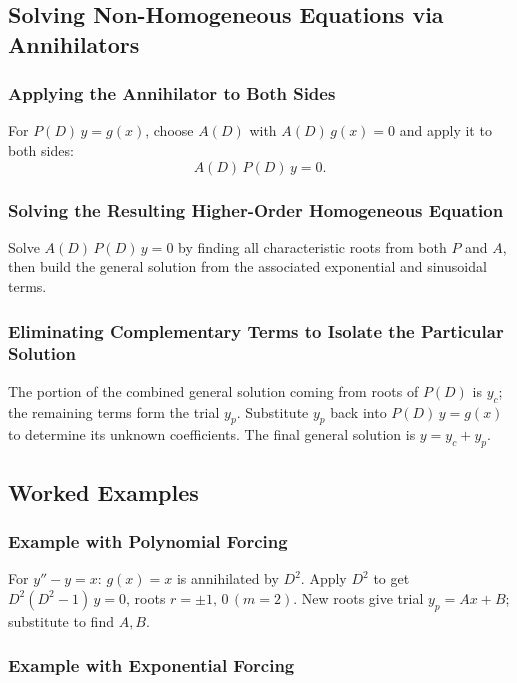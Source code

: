 \documentclass[10pt]{article}
\newcommand{\m}[1]{$#1$}
\newcommand{\annotspace}[1][3.5cm]{\vspace{#1}}
\begin{document}
\subsection{Solving Non-Homogeneous Equations via Annihilators}

    \subsubsection{Applying the Annihilator to Both Sides}
    For \m{P(D)\,y = g(x)}, choose \m{A(D)} with \m{A(D)\,g(x) = 0} and apply it to both sides:
    \[
        A(D)\,P(D)\,y = 0.
    \]

    \subsubsection{Solving the Resulting Higher-Order Homogeneous Equation}
    Solve \m{A(D)\,P(D)\,y = 0} by finding all characteristic roots from both \m{P} and \m{A}, then
    build the general solution from the associated exponential and sinusoidal terms.

    \subsubsection{Eliminating Complementary Terms to Isolate the Particular Solution}
    The portion of the combined general solution coming from roots of \m{P(D)} is \m{y_c}; the
    remaining terms form the trial \m{y_p}. Substitute \m{y_p} back into \m{P(D)\,y = g(x)} to
    determine its unknown coefficients. The final general solution is \m{y = y_c + y_p}.

\subsection{Worked Examples}

    \subsubsection{Example with Polynomial Forcing}

    For \m{y'' - y = x}: \m{g(x) = x} is annihilated by \m{D^2}. Apply \m{D^2} to get
    \m{D^2(D^2 - 1)\,y = 0}, roots \m{r = \pm 1,\, 0\,(m=2)}. New roots give trial
    \m{y_p = Ax + B}; substitute to find \m{A, B}.

    \annotspace[5cm]

    \subsubsection{Example with Exponential Forcing}
\end{document}

